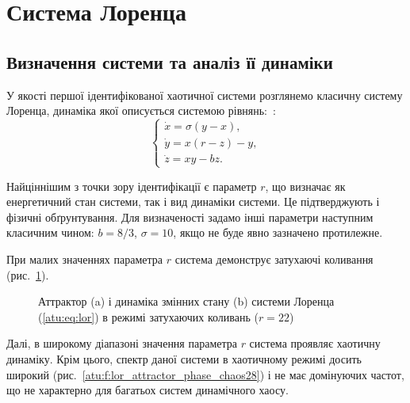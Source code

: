 
\FloatBarrier

\section{Система Лоренца} %
\label{atu:sect:lor}


\subsection{Визначення системи та аналіз її динаміки}%

У якості першої ідентифікованої хаотичної системи розглянемо класичну систему
Лоренца, динаміка якої описується системою
рівнянь:~\cite{moon_chaotic_vibr,anisch_nonlin_eff,chulichkcov_mm_ml_dyn,berje_order_in_chaos}:
%
\begin{equation}
\begin{cases}
  \dot{x} = \sigma (y-x ) , \\
  \dot{y} = x (r-z) - y , \\
  \dot{z} = x y - b z .
\end{cases}
\label{atu:eq:lor}
\end{equation}

Найціннішим з точки зору ідентифікації є параметр $r$, що визначає як
енергетичний стан системи, так і вид динаміки системи. Це підтверджують і
фізичні обґрунтування. Для визначеності задамо інші параметри наступним
класичним чином: $b = 8/3$, $\sigma = 10$, якщо не буде явно
зазначено протилежне.


При малих значеннях параметра $r$ система демонструє затухаючі коливання
(рис.~\ref{atu:f:lor_attractor_fading}).

\begin{figure}[htb!]
  \caption{Аттрактор (a) і динаміка змінних стану (b) системи Лоренца (\ref{atu:eq:lor}) в режимі затухаючих коливань ($r = 22$)}
  \label{atu:f:lor_attractor_fading}
\end{figure}

Далі, в широкому діапазоні значення параметра $r$ система проявляє хаотичну
динаміку. Крім цього, спектр даної системи в хаотичному режимі досить широкий
(рис.~\ref{atu:f:lor_attractor_phase_chaos28}) і не має домінуючих
частот, що не характерно для багатьох систем динамічного хаосу.

